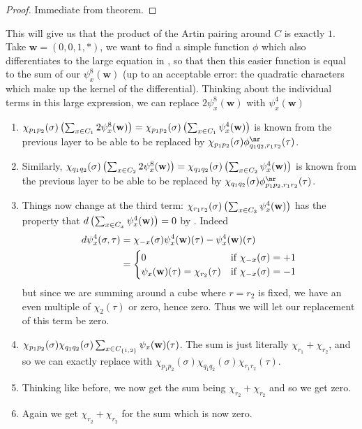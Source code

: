 \documentclass{lecturenotes}
\newcommand{\bw}{\mathbf{w}}
\numberwithin{equation}{section}
\begin{document}
\begin{proof}
    Immediate from theorem.
\end{proof}
This will give us that the product of the Artin pairing around $C$ is exactly $1$.  Take $\bw=(0,0,1,*)$, we want to find a simple function $\phi$ which also differentiates to the large equation in , so that then this easier function is equal to the sum of our $\psi_x^8(\bw)$ (up to an acceptable error: the quadratic characters which make up the kernel of the differential).  Thinking about the individual terms in this large expression, we can replace $2\psi_x^8(\bw)$ with $\psi_x^4(\bw)$
\begin{enumerate}
    \item $\chi_{p_1p_2}(\sigma)\braces{\sum_{x\in C_1}2\psi_x^8(\bw)}=\chi_{p_1p_2}(\sigma)\braces{\sum_{x\in C_1}\psi_x^4(\bw)}$ is known from the previous layer to be able to be replaced by $\chi_{p_1p_2}(\sigma)\phi_{q_1q_2,r_1r_2}^\nr(\tau)$.
    \item Similarly, $\chi_{q_1q_2}(\sigma)\braces{\sum_{x\in C_2}2\psi_x^8(\bw)}=\chi_{q_1q_2}(\sigma)\braces{\sum_{x\in C_2}\psi_x^4(\bw)}$ is known from the previous layer to be able to be replaced by $\chi_{q_1q_2}(\sigma)\phi_{p_1p_2,r_1r_2}^\nr(\tau)$.
    \item Things now change at the third term: $\chi_{r_1r_2}(\sigma)\braces{\sum_{x\in C_3}\psi_x^4(\bw)}$ has the property that $d\braces{\sum_{x\in C_x}\psi_x^4(\bw)}=0$ by .  Indeed
    \begin{align*}
        d\psi_x^4(\sigma,\tau)&=\chi_{-x}(\sigma)\psi_x^4(\bw)(\tau)-\psi_x^4(\bw)(\tau)
        \\&=\begin{cases}
            0&\textnormal{if }\chi_{-x}(\sigma)=+1\\
            \psi_x(\bw)(\tau)=\chi_{r_2}(\tau)&\textnormal{if }\chi_{-x}(\sigma)=-1
        \end{cases}
    \end{align*}
    but since we are summing around a cube where $r=r_2$ is fixed, we have an even multiple of $\chi_2(\tau)$ or zero, hence zero.  Thus we will let our replacement of this term be zero.
    \item $\chi_{p_1p_2}(\sigma)\chi_{q_1q_2}(\sigma)\sum_{x\in C_{\set{1,2}}}\psi_x(\bw)(\tau)$.  The sum is just literally $\chi_{r_1}+\chi_{r_2}$, and so we can exactly replace with $\chi_{p_1p_2}(\sigma)\chi_{q_1q_2}(\sigma)\chi_{r_1r_2}(\tau)$.
    \item Thinking like before, we now get the sum being $\chi_{r_2}+\chi_{r_2}$ and so we get zero.
    \item Again we get $\chi_{r_2}+\chi_{r_2}$ for the sum which is now zero.
\end{enumerate}
\end{document}
